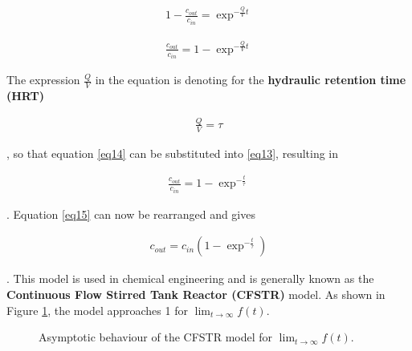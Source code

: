 \documentclass{scrartcl}
\begin{document}
\begin{align}
	1 - \frac{c_{out}}{c_{in}} = \exp^{-\frac{Q}{V}t}
\end{align}

\begin{align}
	\frac{c_{out}}{c_{in}} = 1 - \exp^{-\frac{Q}{V}t}
	\label{eq13}
\end{align}

The expression $\frac{Q}{V}$ in the equation is denoting for the \textbf{hydraulic retention time (HRT)}

\begin{align}
	\frac{Q}{V} = \tau
	\label{eq14}
\end{align}

, so that equation \ref{eq14} can be substituted into \ref{eq13}, resulting in 

\begin{align}
	\frac{c_{out}}{c_{in}} = 1 - \exp^{-\frac{t}{\tau}}
	\label{eq15}
\end{align}

. Equation \ref{eq15} can now be rearranged and gives

\begin{align}
	c_{out} = c_{in} (1 - \exp^{-\frac{t}{\tau}})
\end{align}

. This model is used in chemical engineering and is generally known as the \textbf{Continuous Flow Stirred Tank Reactor (CFSTR)} model. As shown in Figure \ref{fig1}, the model approaches 1 for $\lim_{t \to \infty}f(t)$. \\




\begin{figure}[!h]
	\centering
	\caption{Asymptotic behaviour of the CFSTR model for $\lim_{t \to \infty}f(t)$.}
	\label{fig1}
\end{figure}

\end{document}
